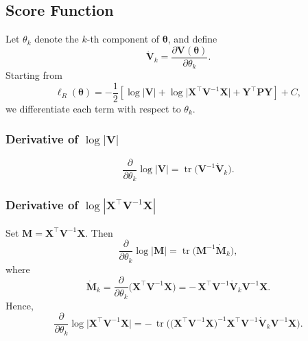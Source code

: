 \documentclass[
  letterpaper,
  DIV=11,
  numbers=noendperiod]{scrartcl}
\begin{document}
\subsection{Score Function}\label{score-function}

Let \(\theta_k\) denote the \(k\)-th component of \(\symbf{\theta}\),
and define \begin{equation}
\dot{\symbf{V}}_k
=
\frac{\partial \symbf{V}(\symbf{\theta})}{\partial \theta_k}.
\end{equation} Starting from \begin{equation}
\ell_R(\symbf{\theta})
=
-\frac{1}{2}\left[
\log|\symbf{V}|
+ \log\big|\symbf{X}^\top \symbf{V}^{-1}\symbf{X}\big|
+ \symbf{Y}^\top \symbf{P}\symbf{Y}
\right]
+ C,
\end{equation} we differentiate each term with respect to \(\theta_k\).

\subsubsection*{Derivative of $\log|\symbf{V}|$}

\begin{equation}
\frac{\partial}{\partial \theta_k}\log|\symbf{V}|
=
\operatorname{tr}\!\big(\symbf{V}^{-1}\dot{\symbf{V}}_k\big).
\end{equation}

\subsubsection*{Derivative of $\log|\symbf{X}^\top \symbf{V}^{-1}\symbf{X}|$}

Set \(\symbf{M} = \symbf{X}^\top \symbf{V}^{-1}\symbf{X}\). Then
\begin{equation}
\frac{\partial}{\partial \theta_k}\log|\symbf{M}|
=
\operatorname{tr}\!\big(\symbf{M}^{-1} \dot{\symbf{M}}_k\big),
\end{equation} where \begin{equation}
\dot{\symbf{M}}_k
=
\frac{\partial}{\partial \theta_k}
\big(\symbf{X}^\top \symbf{V}^{-1}\symbf{X}\big)
=
-\,\symbf{X}^\top \symbf{V}^{-1}
\dot{\symbf{V}}_k
\symbf{V}^{-1}\symbf{X}.
\end{equation} Hence, \begin{equation}
\frac{\partial}{\partial \theta_k}
\log\big|\symbf{X}^\top \symbf{V}^{-1}\symbf{X}\big|
=
-\,\operatorname{tr}\!\Big(
\big(\symbf{X}^\top \symbf{V}^{-1}\symbf{X}\big)^{-1}
\symbf{X}^\top \symbf{V}^{-1}
\dot{\symbf{V}}_k
\symbf{V}^{-1}\symbf{X}
\Big).
\end{equation}
\end{document}
